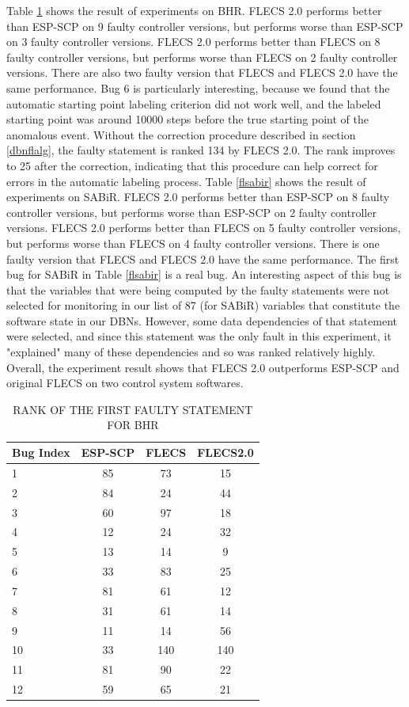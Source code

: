 Table \ref{flbhr} shows the result of experiments on BHR. FLECS 2.0 performs better than ESP-SCP on 9 faulty controller versions, but performs worse than ESP-SCP on 3 faulty controller versions.  FLECS 2.0 performs better than FLECS on 8 faulty controller versions, but performs worse than FLECS on 2 faulty controller versions. There are also two faulty version that FLECS and FLECS 2.0 have the same performance. Bug 6 is particularly interesting, because we found that the automatic starting point labeling criterion did not work well, and the labeled starting point was around 10000 steps before the true starting point of the anomalous event. Without the correction procedure described in section \ref{dbnflalg}, the faulty statement is ranked 134 by FLECS 2.0. The rank improves to 25 after the correction, indicating that this procedure can help correct for errors in the automatic labeling process. Table \ref{flsabir} shows the result of experiments on SABiR. FLECS 2.0 performs better than ESP-SCP on 8 faulty controller versions, but performs worse than ESP-SCP on 2 faulty controller versions.  FLECS 2.0 performs better than FLECS on 5 faulty controller versions, but performs worse than FLECS on 4 faulty controller versions. There is one faulty version that FLECS and FLECS 2.0 have the same performance. The first bug for SABiR in Table \ref{flsabir} is a real bug.  An interesting aspect of this bug is that the variables that were being computed by the faulty statements were not selected for monitoring in our list of 87 (for SABiR) variables that constitute the software state in our DBNs. However, some data dependencies of that statement were selected, and since this statement was the only fault in this experiment, it "explained" many of these dependencies and so was ranked relatively highly. Overall, the experiment result shows that FLECS 2.0 outperforms ESP-SCP and original FLECS on two control system softwares. 

\begin{table}[htbp!]
\centering
\caption{RANK OF THE FIRST FAULTY STATEMENT FOR BHR}
\label{flbhr}
      \begin{tabular}{|l|c|c|c|}
      \hline
Bug Index	&	ESP-SCP	&	FLECS	&	FLECS2.0	\\ \hline
1	&	85	&	73	&	15	\\ \hline
2	&	84	&	24	&	44	\\ \hline
3	&	60	&	97	&	18	\\ \hline
4	&	12	&	24	&	32	\\ \hline
5	&	13	&	14	&	9	\\ \hline
6	&	33	&	83	&	25	\\ \hline
7	&	81	&	61	&	12	\\ \hline
8	&	31	&	61	&	14	\\ \hline
9	&	11	&	14	&	56	\\ \hline
10	&	33	&	140	&	140  \\ \hline
11	&	81	&	90	&	22	\\ \hline
12	&	59	&	65	&	21	\\ \hline
\end{tabular}
\end{table}

